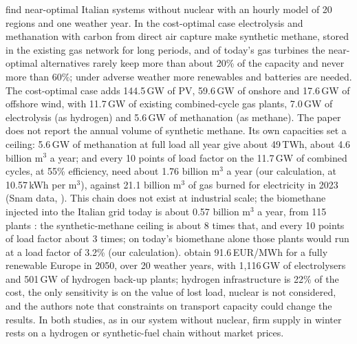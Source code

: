 \citet{Lombardi2020} find near-optimal Italian systems without nuclear with an hourly model of 20 regions and one weather year. In the cost-optimal case electrolysis and methanation with carbon from direct air capture make synthetic methane, stored in the existing gas network for long periods, and of today's gas turbines the near-optimal alternatives rarely keep more than about 20\% of the capacity and never more than 60\%; under adverse weather more renewables and batteries are needed. The cost-optimal case adds 144.5\,GW of PV, 59.6\,GW of onshore and 17.6\,GW of offshore wind, with 11.7\,GW of existing combined-cycle gas plants, 7.0\,GW of electrolysis (as hydrogen) and 5.6\,GW of methanation (as methane). The paper does not report the annual volume of synthetic methane. Its own capacities set a ceiling: 5.6\,GW of methanation at full load all year give about 49\,TWh, about 4.6 billion m$^3$ a year; and every 10 points of load factor on the 11.7\,GW of combined cycles, at 55\% efficiency, need about 1.76 billion m$^3$ a year (our calculation, at 10.57\,kWh per m$^3$), against 21.1 billion m$^3$ of gas burned for electricity in 2023 (Snam data, \citealp{QEGas2023}). This chain does not exist at industrial scale; the biomethane injected into the Italian grid today is about 0.57 billion m$^3$ a year, from 115 plants \citep{QEBiomethane2024}: the synthetic-methane ceiling is about 8 times that, and every 10 points of load factor about 3 times; on today's biomethane alone those plants would run at a load factor of 3.2\% (our calculation). \citet{Franzmann2026} obtain 91.6\,EUR/MWh for a fully renewable Europe in 2050, over 20 weather years, with 1{,}116\,GW of electrolysers and 501\,GW of hydrogen back-up plants; hydrogen infrastructure is 22\% of the cost, the only sensitivity is on the value of lost load, nuclear is not considered, and the authors note that constraints on transport capacity could change the results. In both studies, as in our system without nuclear, firm supply in winter rests on a hydrogen or synthetic-fuel chain without market prices.

